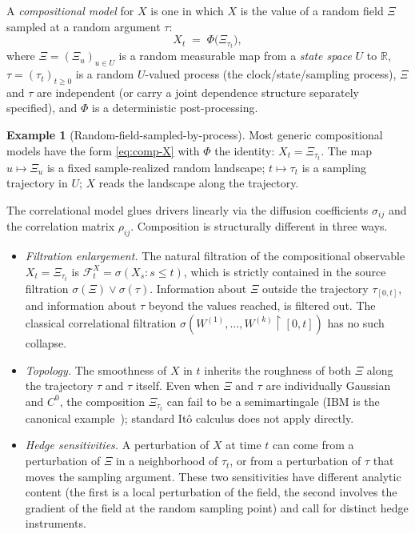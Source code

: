 \documentclass[11pt,reqno]{amsart}
\theoremstyle{plain}
\theoremstyle{definition}
\newtheorem{example}[theorem]{Example}
\theoremstyle{remark}
\newcommand{\R}{\mathbb R}
\newcommand{\cF}{\mathcal F}
\begin{document}
A \emph{compositional model} for $X$ is one in which $X$ is the
value of a random field $\Xi$ sampled at a random argument
$\tau$:
\begin{equation}\label{eq:comp-X}
  X_{t}\;=\;\Phi\bigl(\Xi_{\tau_{t}}\bigr),
\end{equation}
where $\Xi=(\Xi_{u})_{u\in U}$ is a random measurable map from
a \emph{state space} $U$ to $\R$, $\tau=(\tau_{t})_{t\ge 0}$ is
a random $U$-valued process (the clock/state/sampling process),
$\Xi$ and $\tau$ are independent (or carry a joint dependence
structure separately specified), and $\Phi$ is a deterministic
post-processing.

\begin{example}[Random-field-sampled-by-process]\label{ex:field-sample}
Most generic compositional models have the form
\eqref{eq:comp-X} with $\Phi$ the identity:
$X_{t}=\Xi_{\tau_{t}}$. The map $u\mapsto\Xi_{u}$ is a fixed
sample-realized random landscape; $t\mapsto\tau_{t}$ is a
sampling trajectory in $U$; $X$ reads the landscape along the
trajectory.
\end{example}

The correlational model glues drivers linearly via the diffusion
coefficients $\sigma_{ij}$ and the correlation matrix
$\rho_{ij}$. Composition is structurally different in three
ways.

\begin{itemize}
\item \emph{Filtration enlargement.} The natural filtration of
the compositional observable $X_{t}=\Xi_{\tau_{t}}$ is
$\cF^{X}_{t}=\sigma(X_{s}:s\le t)$, which is strictly contained
in the source filtration $\sigma(\Xi)\vee\sigma(\tau)$.
Information about $\Xi$ outside the trajectory $\tau_{[0,t]}$,
and information about $\tau$ beyond the values reached, is
filtered out. The classical correlational filtration
$\sigma(W^{(1)},\ldots,W^{(k)}\restriction[0,t])$ has no such
collapse.

\item \emph{Topology.} The smoothness of $X$ in $t$ inherits
the roughness of both $\Xi$ along the trajectory $\tau$ and
$\tau$ itself. Even when $\Xi$ and $\tau$ are individually
Gaussian and $C^{0}$, the composition $\Xi_{\tau_{t}}$ can fail
to be a semimartingale (IBM is the canonical
example~\cite{EnergyFirst}); standard It\^o calculus does not
apply directly.

\item \emph{Hedge sensitivities.} A perturbation of $X$ at time
$t$ can come from a perturbation of $\Xi$ in a neighborhood of
$\tau_{t}$, or from a perturbation of $\tau$ that moves the
sampling argument. These two sensitivities have different
analytic content (the first is a local perturbation of the
field, the second involves the gradient of the field at the
random sampling point) and call for distinct hedge instruments.
\end{itemize}
\end{document}

